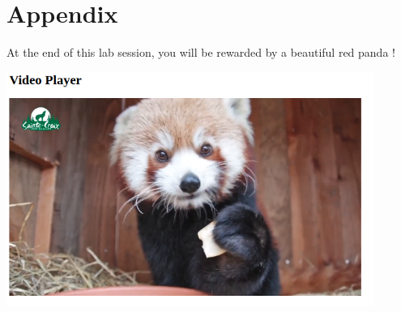 \documentclass[a4paper,11pt]{exam}
\begin{document}
\section{Appendix}

At the end of this lab session, you will be rewarded by a beautiful red panda !
\begin{center}
	\includegraphics[width=12cm]{fig/redpanda.png}	
\end{center}
\end{document}
